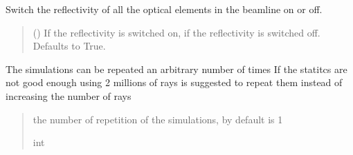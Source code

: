 \documentclass[letterpaper,10pt,english]{sphinxmanual}
\begin{document}
\begin{fulllineitems}
\begin{fulllineitems}
\label{\detokenize{code_documentation:raypyng.simulate.Simulate.reflectivity}}
\pysigstartsignatures
{}
\pysigstopsignatures
\sphinxAtStartPar
Switch the reflectivity of all the optical elements in the beamline on or off.
\begin{quote}\begin{description}
\sphinxAtStartPar
{} (\sphinxstyleliteralemphasis{\sphinxupquote{, }}) \textendash{} If  the reflectivity is switched on,
if  the reflectivity is switched off.
Defaults to True.

\end{description}\end{quote}

\end{fulllineitems}


\begin{fulllineitems}
\label{\detokenize{code_documentation:raypyng.simulate.Simulate.repeat}}
\pysigstartsignatures
{}
\pysigstopsignatures
\sphinxAtStartPar
The simulations can be repeated an arbitrary number of times
If the statitcs are not good enough using 2 millions of rays is suggested
to repeat them instead of increasing the number of rays
\begin{quote}\begin{description}
\sphinxAtStartPar
the number of repetition of the simulations, by default is 1

\sphinxAtStartPar
int

\end{description}\end{quote}

\end{fulllineitems}



\end{fulllineitems}
\end{document}
